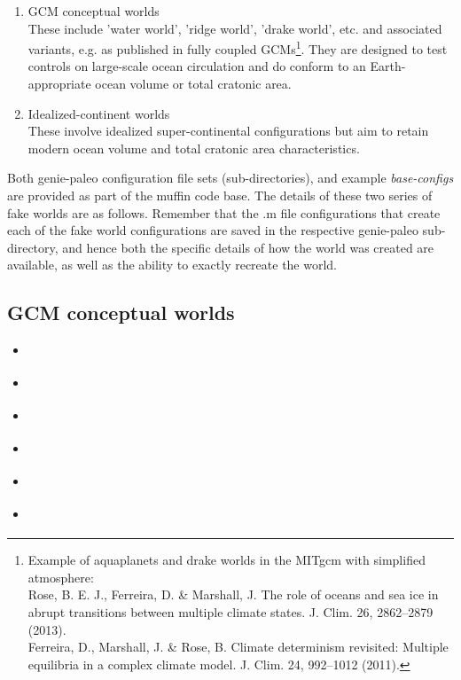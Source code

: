 \documentclass[11pt,fleqn]{book} %
\begin{document}
\begin{enumerate}[noitemsep]
\vspace{1mm}
\item GCM conceptual worlds
\\These include 'water world', 'ridge world', 'drake world', etc. and associated variants, e.g. as published in fully coupled GCMs\footnote{Example of aquaplanets and drake worlds in the MITgcm with simplified atmosphere:
\\Rose, B. E. J., Ferreira, D. \& Marshall, J. The role of oceans and sea ice in abrupt transitions between multiple climate states. J. Clim. 26, 2862–2879 (2013).
\\Ferreira, D., Marshall, J. \& Rose, B. Climate determinism revisited: Multiple equilibria in a complex climate model. J. Clim. 24, 992–1012 (2011).}. They are designed to test controls on large-scale ocean circulation and do conform to an Earth-appropriate ocean volume or total cratonic area.
\vspace{1mm}
\item Idealized-continent worlds
\\These involve idealized super-continental configurations but aim to retain modern ocean volume and total cratonic area characteristics.
\end{enumerate}
\vspace{1mm}

Both \textsf{\footnotesize genie-paleo} configuration file sets (sub-directories), and example \textit{base-configs} are provided as part of the muffin code base. The details of these two series of fake worlds are as follows. Remember that the \textsf{\footnotesize .m} file configurations that create each of the fake world configurations are saved in the respective \textsf{\footnotesize genie-paleo} sub-directory, and hence both the specific details of how the world was created are available, as well as the ability to exactly recreate the world.

%
\subsection{GCM conceptual worlds}

\small\begin{itemize}[noitemsep]
\vspace{1mm}
\item \textsf{\footnotesize }
\item \textsf{\footnotesize }
\item \textsf{\footnotesize }
\item \textsf{\footnotesize }
\item \textsf{\footnotesize }
\item \textsf{\footnotesize }
\end{itemize}\normalsize
\vspace{1mm}
\end{document}
